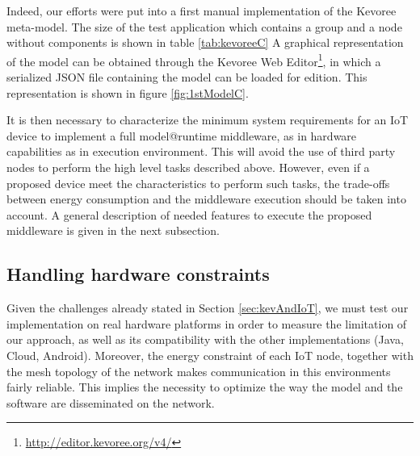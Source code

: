 Indeed, our efforts were put into a first manual implementation of the Kevoree meta-model.
The size of the test application which contains a group and a node without components is shown in table \ref{tab:kevoreeC}
A graphical representation of the model can be obtained through the Kevoree Web Editor\footnote{\url{http://editor.kevoree.org/v4/}}, in which a serialized JSON file containing the model can be loaded for edition.
This representation is shown in figure \ref{fig:1stModelC}.


It is then necessary to characterize the minimum system requirements for an IoT device to implement a full model@runtime middleware, as in hardware capabilities as in execution environment.
This will avoid the use of third party nodes to perform the high level tasks described above.
However, even if a proposed device meet the characteristics to perform such tasks, the trade-offs between energy consumption and the middleware execution should be taken into account.
A general description of needed features to execute the proposed middleware is given in the next subsection.

\subsection{Handling hardware constraints}

Given the challenges already stated in Section \ref{sec:kevAndIoT}, we must test our implementation on real hardware platforms in order to measure the limitation of our approach, as well as its compatibility with the other implementations (Java, Cloud, Android).
Moreover, the energy constraint of each IoT node, together with the mesh topology of the network makes communication in this environments fairly reliable.
This implies the necessity to optimize the way the model and the software are disseminated on the network.

